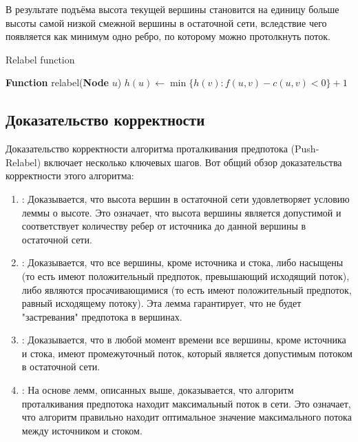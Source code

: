     В результате подъёма высота текущей вершины становится на единицу больше высоты самой низкой смежной вершины в остаточной сети, вследствие чего появляется как минимум одно ребро, по которому можно протолкнуть поток.

    \begin{algorithm}
    \caption{Relabel function}
        \begin{algorithmic}
        \STATE \textbf{Function} relabel(\textbf{Node} $u$)
            \STATE \quad\quad $h(u) \gets \min\{h(v) : f(u, v) - c(u, v) < 0\} + 1$
        \EndFunction
        \end{algorithmic}
    \end{algorithm}
    
    
    \subsection{Доказательство корректности}

        Доказательство корректности алгоритма проталкивания предпотока (Push-Relabel) включает несколько ключевых шагов. Вот общий обзор доказательства корректности этого алгоритма:
        \begin{enumerate}
            \item {}: Доказывается, что высота вершин в остаточной сети удовлетворяет условию леммы о высоте. Это означает, что высота вершины является допустимой и соответствует количеству ребер от источника до данной вершины в остаточной сети.
            \item {}: Доказывается, что все вершины, кроме источника и стока, либо насыщены (то есть имеют положительный предпоток, превышающий исходящий поток), либо являются просачивающимися (то есть имеют положительный предпоток, равный исходящему потоку). Эта лемма гарантирует, что не будет "застревания" предпотока в вершинах.
            \item {}: Доказывается, что в любой момент времени все вершины, кроме источника и стока, имеют промежуточный поток, который является допустимым потоком в остаточной сети.
            \item {}: На основе лемм, описанных выше, доказывается, что алгоритм проталкивания предпотока находит максимальный поток в сети. Это означает, что алгоритм правильно находит оптимальное значение максимального потока между источником и стоком.
        \end{enumerate}
    
